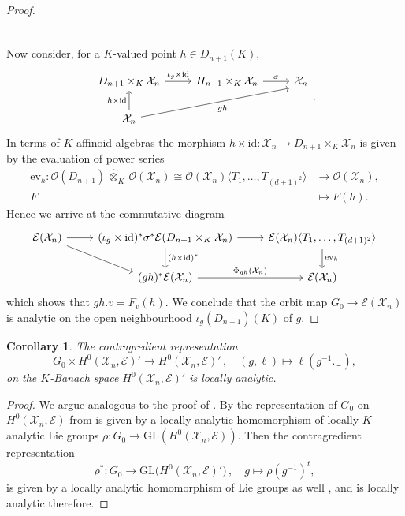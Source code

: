 \documentclass[a4paper, reqno, 10pt]{amsart}
\newtheorem{corollary}[theorem]{Corollary}
\theoremstyle{definition}
\numberwithin{equation}{section}
\newcommand{\blank}{{\,\_\,}}
\newcommand{\cotimes}[1]{{\,\widehat{\otimes}_{#1}\,}}
\newcommand{\GL}{{\mathrm{GL}}}
\newcommand{\id}{{\mathrm{id}}}
\newcommand{\lra}{\longrightarrow}
\newcommand{\lto}{\longmapsto}
\newcommand{\ra}{\rightarrow}
\newcommand{\CE}{{\mathcal {E}}}
\newcommand{\CO}{{\mathcal {O}}}
\newcommand{\CX}{{\mathcal {X}}}
\begin{document}
\begin{proof}
\begin{equation*}
\begin{tikzcd}[,/tikz/column 3/.append style={anchor=base west}]
		\end{tikzcd}
	\end{equation*}
	Now consider, for a $K$-valued point $h \in D_{n+1}(K)$,
	\[\begin{tikzcd}
		D_{n+1} \times_K \CX_n \arrow[r, "\iota_g \times \id"] & H_{n+1} \times_K \CX_n \arrow[r, "\sigma"] & \CX_n \\
		\CX_n \arrow[u, "h \times \id"]  \arrow[urr,  "gh"', end anchor = 210] &&
	\end{tikzcd}.\]
	In terms of $K$-affinoid algebras the morphism $h \times \id\colon \CX_n \ra D_{n+1} \times_K \CX_n$ is given by the evaluation of power series
	\begin{align*}
		\mathrm{ev}_h \colon \CO(D_{n+1}) \cotimes{K} \CO(\CX_n) \cong \CO(\CX_n) \langle T_1,\ldots,T_{(d+1)^2} \rangle &\lra \CO(\CX_n) , \\
		F &\lto F(h) .
	\end{align*}
	Hence we arrive at the commutative diagram 
	\[\begin{tikzcd}
		\CE(\CX_n) \arrow[r] \arrow[rd, end anchor = 170] & (\iota_g\times\id)^\ast \sigma^\ast \CE(D_{n+1}\times_K \CX_n) \arrow[d, "(h\times\id)^\ast"] \arrow[r] & \CE(\CX_n)\langle T_1,\ldots,T_{(d+1)^2} \rangle \arrow[d, "\mathrm{ev}_h"]\\
		& (gh)^\ast \CE(\CX_n) \arrow[r, "\Phi_{gh}(\CX_n)"] &\CE(\CX_n) 
	\end{tikzcd}\]
	which shows that $gh.v = F_v(h)$.
	We conclude that the orbit map $G_0 \ra \CE(\CX_n)$ is analytic on the open neighbourhood $\iota_g (D_{n+1})(K)$ of $g$.
\end{proof}


\begin{corollary}\label{Cor 2 - Dual of sections on X_n are locally analytic representation}
	The contragredient representation
	\[G_0 \times H^0(\CX_n,\CE)' \lra H^0(\CX_n,\CE)' \,,\quad (g,\ell) \lto \ell(g^{-1}.\blank) ,\]
	on the $K$-Banach space $H^0(\CX_n,\CE)'$ is locally analytic.
\end{corollary}
\begin{proof}
	We argue analogous to the proof of \cite[Prop 3.8]{SchneiderTeitelbaum02pAdicBoundVal}.
	By  the representation of $G_0$ on $H^0(\CX_n,\CE)$ from  is given by a locally analytic homomorphism of locally $K$-analytic Lie groups $\rho \colon G_0 \ra \GL(H^0(\CX_n,\CE))$.
	Then the contragredient representation
	\[\rho^\ast \colon G_0 \lra \GL\big(H^0(\CX_n,\CE)' \big)\,,\quad g \lto  \rho(g^{-1})^t , \]
	is given by a locally analytic homomorphism of Lie groups as well \cite[III.\ \S 3.11 Cor.\ 2]{Bourbaki89LieGrpLieAlg1to3}, and is locally analytic therefore.
\end{proof}
\end{document}
